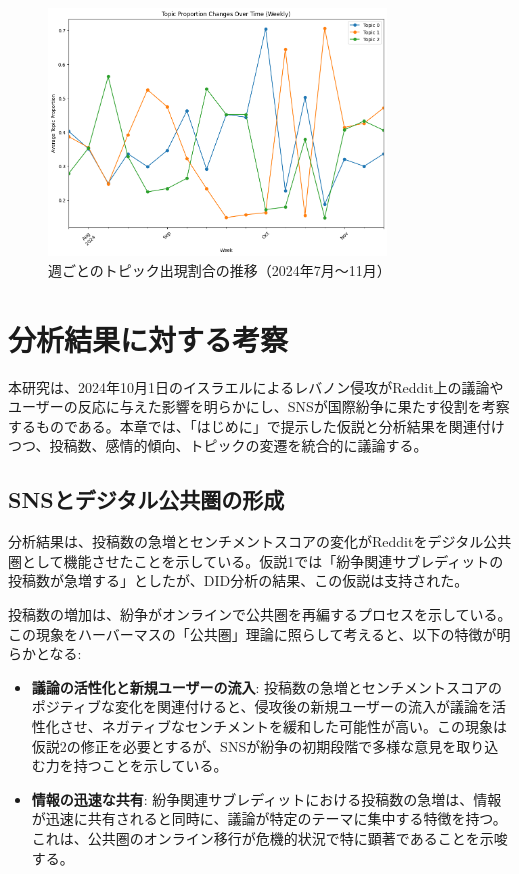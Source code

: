 \documentclass[11pt, a4j]{jreport}
\begin{document}
    \begin{figure}[H]
        \centering
        \includegraphics[width=0.8\textwidth]{topic_trends_plot.png}
        \caption{週ごとのトピック出現割合の推移（2024年7月～11月）}
        \label{fig:topic_trends}
    \end{figure}

    \section{分析結果に対する考察}

    本研究は、2024年10月1日のイスラエルによるレバノン侵攻がReddit上の議論やユーザーの反応に与えた影響を明らかにし、SNSが国際紛争に果たす役割を考察するものである。本章では、「はじめに」で提示した仮説と分析結果を関連付けつつ、投稿数、感情的傾向、トピックの変遷を統合的に議論する。

    \subsection{SNSとデジタル公共圏の形成}
    分析結果は、投稿数の急増とセンチメントスコアの変化がRedditをデジタル公共圏として機能させたことを示している。仮説1では「紛争関連サブレディットの投稿数が急増する」としたが、DID分析の結果、この仮説は支持された。

    投稿数の増加は、紛争がオンラインで公共圏を再編するプロセスを示している。この現象をハーバーマスの「公共圏」理論\cite{habermas1989structural}に照らして考えると、以下の特徴が明らかとなる:

    \begin{itemize}
        \item \textbf{議論の活性化と新規ユーザーの流入}: 投稿数の急増とセンチメントスコアのポジティブな変化を関連付けると、侵攻後の新規ユーザーの流入が議論を活性化させ、ネガティブなセンチメントを緩和した可能性が高い。この現象は仮説2の修正を必要とするが、SNSが紛争の初期段階で多様な意見を取り込む力を持つことを示している。
        \item \textbf{情報の迅速な共有}: 紛争関連サブレディットにおける投稿数の急増は、情報が迅速に共有されると同時に、議論が特定のテーマに集中する特徴を持つ。これは、公共圏のオンライン移行が危機的状況で特に顕著であることを示唆する。
    \end{itemize}
\end{document}
